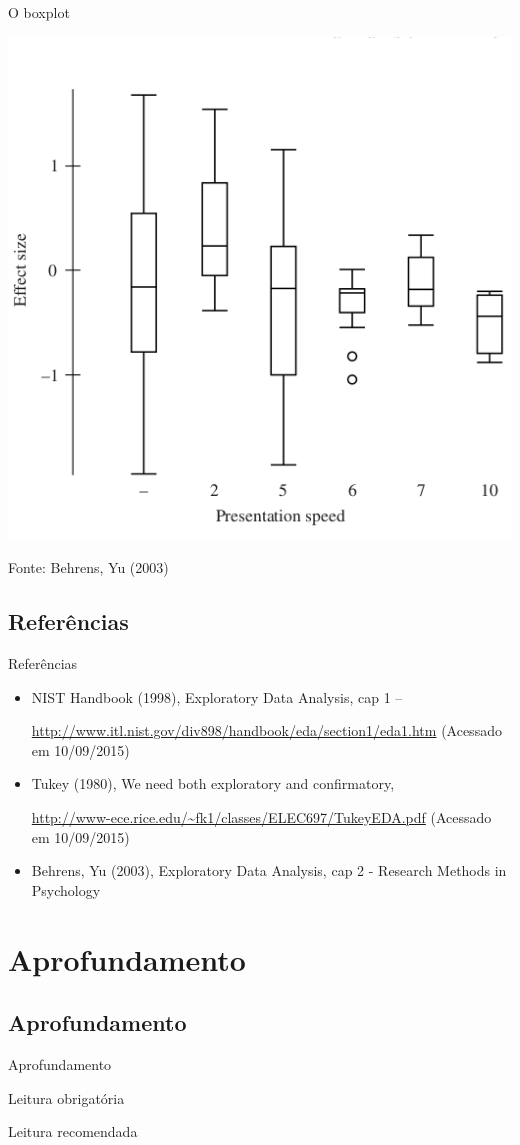 \documentclass{beamer}
\begin{document}
\begin{frame}{O boxplot}
  \begin{center}
    \includegraphics[height=0.7\textheight]{EDA/eda-boxplot2}
  \end{center}

  \vfill
  \scriptsize
  \hfill Fonte: Behrens, Yu (2003)
\end{frame}

\subsection{Referências}

\begin{frame}{Referências}
  \begin{itemize}
    \scriptsize
  \item<1-> NIST Handbook (1998), Exploratory Data Analysis, cap 1 --

    {\tiny \url{http://www.itl.nist.gov/div898/handbook/eda/section1/eda1.htm}}
    (Acessado em 10/09/2015)
  \item<1-> Tukey (1980), We need both exploratory and confirmatory,

    {\tiny \url{http://www-ece.rice.edu/~fk1/classes/ELEC697/TukeyEDA.pdf}}
    (Acessado em 10/09/2015)
  \item<1-> Behrens, Yu (2003), Exploratory Data Analysis, cap 2 -
    Research Methods in Psychology
  \end{itemize}
\end{frame}

\section{Aprofundamento}

\subsection{Aprofundamento}

\begin{frame}{Aprofundamento}
  \begin{block}{Leitura obrigatória}
  \end{block}
  \begin{block}{Leitura recomendada}
  \end{block}
\end{frame}
\end{document}
